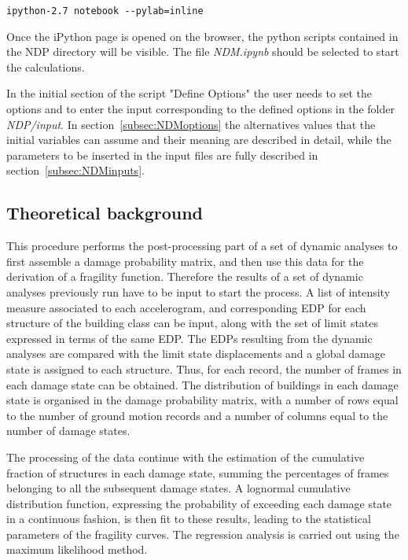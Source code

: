 \begin{Verbatim}[frame=single, commandchars=\\\{\}, samepage=true]
ipython-2.7 notebook --pylab=inline
\end{Verbatim}

Once the iPython page is opened on the browser, the python scripts contained in the NDP directory will be visible. The file \textit{NDM.ipynb} should be selected to start the calculations.

In the initial section of the script "Define Options" the user needs to set the options and to enter the input corresponding to the defined options in the folder \textit{NDP/input}. In section~\ref{subsec:NDMoptions} the alternatives values that the initial variables can assume and their meaning are described in detail, while the parameters to be inserted in the input files are fully described in section~\ref{subsec:NDMinputs}.

\subsection{Theoretical background}
\label{subsec:NDMtheory}
This procedure performs the post-processing part of a set of dynamic analyses to first assemble a damage probability matrix, and then use this data for the derivation of a fragility function. Therefore the results of a set of dynamic analyses previously run have to be input to start the process. A list of intensity measure associated to each accelerogram, and corresponding EDP for each structure of the building class can be input, along with the set of limit states expressed in terms of the same EDP. The EDPs resulting from the dynamic analyses are compared with the limit state displacements and a global damage state is assigned to each structure. Thus, for each record, the number of frames in each damage state can be obtained. The distribution of buildings in each damage state is organised in the damage probability matrix, with a number of rows equal to the number of ground motion records and a number of columns equal to the number of damage states.

The processing of the data continue with the estimation of the cumulative fraction of structures in each damage state, summing the percentages of frames belonging to all the subsequent damage states. A lognormal cumulative distribution function, expressing the probability of exceeding each damage state in a continuous fashion, is then fit to these results, leading to the statistical parameters of the fragility curves. The regression analysis is carried out using the maximum likelihood method.


